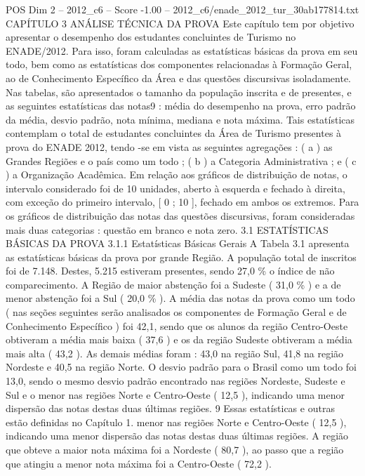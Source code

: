 \begin{textsample}{POS Dim 2 – 2012\_c6 – Score -1.00 – 2012\_c6/enade\_2012\_tur\_30ab177814.txt}  \label{ex:f2_pos_251}
CAPÍTULO 3 ANÁLISE TÉCNICA DA PROVA Este capítulo tem por objetivo apresentar o desempenho dos estudantes concluintes de Turismo no ENADE/2012.
Para isso, foram calculadas as estatísticas básicas da prova em seu todo, bem como as estatísticas dos componentes relacionadas à Formação Geral, ao de Conhecimento Específico da Área e das questões discursivas isoladamente.
Nas tabelas, são apresentados o tamanho da população inscrita e de presentes, e as seguintes estatísticas das notas9 : média do desempenho na prova, erro padrão da média, desvio padrão, nota mínima, mediana e nota máxima.
Tais estatísticas contemplam o total de estudantes concluintes da Área de Turismo presentes à prova do ENADE 2012, tendo -se em vista as seguintes agregações : ( a ) as Grandes Regiões e o país como um todo ; ( b ) a Categoria Administrativa ; e ( c ) a Organização Acadêmica.
Em relação aos gráficos de distribuição de notas, o intervalo considerado foi de 10 unidades, aberto à esquerda e fechado à direita, com exceção do primeiro intervalo, [ 0 ; 10 ], fechado em ambos os extremos.
Para os gráficos de distribuição das notas das questões discursivas, foram consideradas mais duas categorias : questão em branco e nota zero. 3.1 ESTATÍSTICAS BÁSICAS DA PROVA 3.1.1 Estatísticas Básicas Gerais A Tabela 3.1 apresenta as estatísticas básicas da prova por grande Região.
A população total de inscritos foi de 7.148.
Destes, 5.215 estiveram presentes, sendo 27,0 \% o índice de não comparecimento.
A Região de maior abstenção foi a Sudeste ( 31,0 \% ) e a de menor abstenção foi a Sul ( 20,0 \% ).
A média das notas da prova como um todo ( nas seções seguintes serão analisados os componentes de Formação Geral e de Conhecimento Específico ) foi 42,1, sendo que os alunos da região Centro-Oeste obtiveram a média mais baixa ( 37,6 ) e os da região Sudeste obtiveram a média mais alta ( 43,2 ).
As demais médias foram : 43,0 na região Sul, 41,8 na região Nordeste e 40,5 na região Norte.
O desvio padrão para o Brasil como um todo foi 13,0, sendo o mesmo desvio padrão encontrado nas regiões Nordeste, Sudeste e Sul e o menor nas regiões Norte e Centro-Oeste ( 12,5 ), indicando uma menor dispersão das notas destas duas últimas regiões. 9 Essas estatísticas e outras estão definidas no Capítulo 1. menor nas regiões Norte e Centro-Oeste ( 12,5 ), indicando uma menor dispersão das notas destas duas últimas regiões.
A região que obteve a maior nota máxima foi a Nordeste ( 80,7 ), ao passo que a região que atingiu a menor nota máxima foi a Centro-Oeste ( 72,2 ).

\end{textsample}
